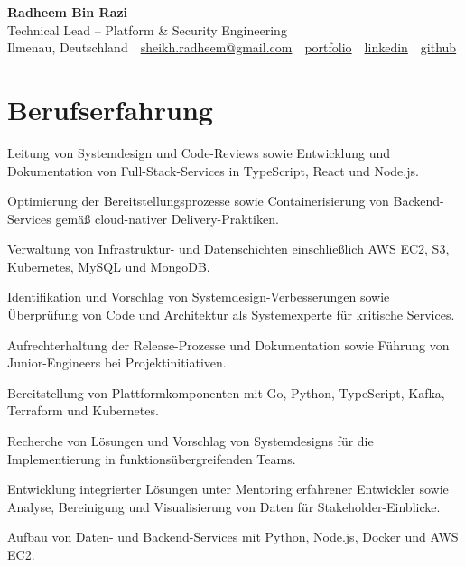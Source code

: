 \documentclass[11pt,a4paper]{resume}
\makeatletter
\newcommand{\Portfolio}{https://radheem.github.io/my-cv}
\newcommand{\PortfolioText}{portfolio}
\newcommand{\GitHub}{https://github.com/radheem}
\newcommand{\LinkedIn}{https://www.linkedin.com/in/radheem-razi}
\newcommand{\Email}{sheikh.radheem@gmail.com}
\makeatother
\begin{document}
\clearpage
{}

\begin{center}
  {\huge\bfseries Radheem Bin Razi}\\[3pt]
  {\large Technical Lead – Platform \& Security Engineering}\\[6pt]
  \small
  Ilmenau, Deutschland \,\textbar\,
  \href{mailto:\Email}{\Email} \,\textbar\,
  \href{\Portfolio}{\PortfolioText} \,\textbar\,
  \href{\LinkedIn}{linkedin} \,\textbar\,
  \href{\GitHub}{github}
\end{center}
\vspace{2pt}

\section{Berufserfahrung}

\bullets
  \item Leitung von Systemdesign und Code-Reviews sowie Entwicklung und Dokumentation von Full-Stack-Services in TypeScript, React und Node.js.
  \item Optimierung der Bereitstellungsprozesse sowie Containerisierung von Backend-Services gemäß cloud-nativer Delivery-Praktiken.
  \item Verwaltung von Infrastruktur- und Datenschichten einschließlich AWS EC2, S3, Kubernetes, MySQL und MongoDB.
\bulletsend
\vspace{3pt}
\bullets
  \item Identifikation und Vorschlag von Systemdesign-Verbesserungen sowie Überprüfung von Code und Architektur als Systemexperte für kritische Services.
  \item Aufrechterhaltung der Release-Prozesse und Dokumentation sowie Führung von Junior-Engineers bei Projektinitiativen.
  \item Bereitstellung von Plattformkomponenten mit Go, Python, TypeScript, Kafka, Terraform und Kubernetes.
\bulletsend
\vspace{3pt}
\bullets
  \item Recherche von Lösungen und Vorschlag von Systemdesigns für die Implementierung in funktionsübergreifenden Teams.
  \item Entwicklung integrierter Lösungen unter Mentoring erfahrener Entwickler sowie Analyse, Bereinigung und Visualisierung von Daten für Stakeholder-Einblicke.
  \item Aufbau von Daten- und Backend-Services mit Python, Node.js, Docker und AWS EC2.
\bulletsend
\vspace{3pt}
\end{document}
